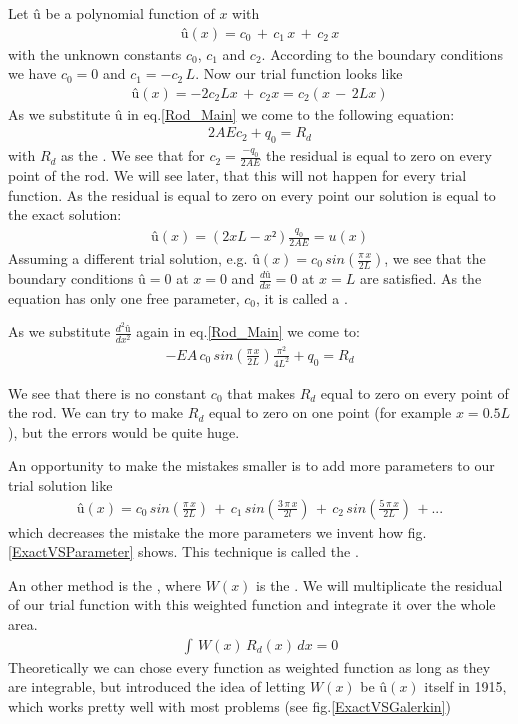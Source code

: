 Let $û$ be a polynomial function of $x$ with 
\begin{align}
û(x)=c_0\,+\,c_1\,x\,+\,c_2\,x \nonumber
\end{align}
with the unknown constants $c_0$, $c_1$ and $c_2$. According to the boundary conditions we have $c_0=0$ and $c_1=-c_2\,L$. Now our trial function looks like
\begin{align}
û(x)=-2c_2Lx\,+\,c_2x=c_2(x\,-\,2Lx) \nonumber
\end{align}
As we substitute $û$ in eq.\ref{Rod_Main} we come to the following equation:
\begin{align}
2AEc_2+q_0=R_d \nonumber
\end{align}
with $R_d$ as the . We see that for $c_2=\frac{-q_0}{2AE}$ the residual is equal to zero on every point of the rod. We will see later, that this will not happen for every trial function. As the residual is equal to zero on every point our solution is equal to the exact solution:
\begin{align}
û(x)=(2xL-x²)\frac{q_0}{2AE}=u(x) \nonumber
\end{align}
Assuming a different trial solution, e.g. $û(x)=c_0\,sin(\frac{\pi\,x}{2L})$, we see that the boundary conditions $û=0$ at $x=0$ and $\frac{dû}{dx}=0$ at $x=L$ are satisfied. As the equation has only one free parameter, $c_0$, it is called a .

As we substitute $\frac{d^2û}{dx^2}$ again in eq.\ref{Rod_Main} we come to:
\begin{align}
-EA\, c_0\,sin\left(\frac{\pi\,x}{2L}\right)\frac{\pi^2}{4L^2}+q_0=R_d \nonumber
\end{align}

We see that there is no constant $c_0$ that makes $R_d$ equal to zero on every point of the rod. We can try to make $R_d$ equal to zero on one point (for example $x=0.5L$), but the errors would be quite huge. 

An opportunity to make the mistakes smaller is to add more parameters to our trial solution like
\begin{align}
û(x)=c_0\,sin\left(\frac{\pi\,x}{2L}\right)\,+\,c_1\,sin\left(\frac{3\,\pi\,x}{2l}\right)\,+\,c_2\,sin\left(\frac{5\,\pi\,x}{2L}\right)\,+... 
\end{align}
which decreases the mistake the more parameters we invent how fig.\ref{ExactVSParameter} shows. This technique is called the .

\bigskip
An other method is the , where $W(x)$ is the . We will multiplicate the residual of our trial function with this weighted function and integrate it over the whole area. 
\begin{align}
\int\,W(x)\,R_d(x)\,dx=0 \nonumber
\end{align}
Theoretically we can chose every function as weighted function as long as they are integrable, but  introduced the idea of letting $W(x)$ be $û(x)$ itself in 1915, which works pretty well with most problems (see fig.\ref{ExactVSGalerkin})

